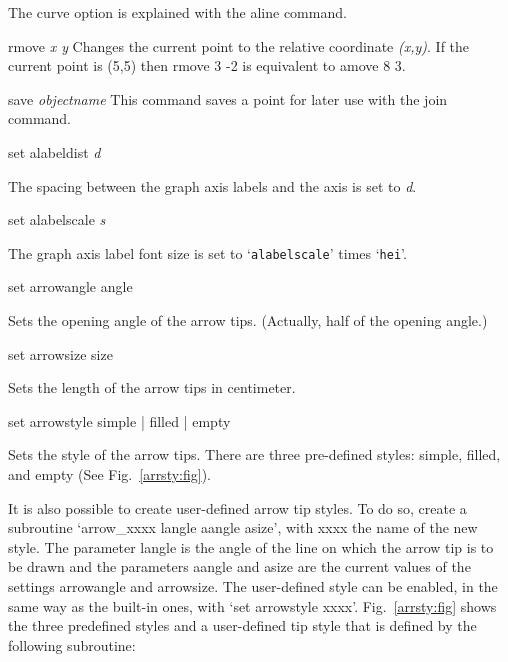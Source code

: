 \begin{commanddescription}
The {\sf curve} option is explained with the {\sf aline} command.

\item[{\sf rmove {\it x y}}]
 Changes the current point to the relative coordinate
{\it (x,y)}.  If the
current point is (5,5) then {\sf rmove 3 -2} is equivalent to {\sf amove 8 3}.

\item[{\sf save {\it objectname}} ]
This command saves a point for later use with the join command.

\item[{\sf set alabeldist {\it d}}]

The spacing between the graph axis labels and the axis is set to {\it d}.

\item[{\sf set alabelscale {\it s}}]

The graph axis label font size is set to `\texttt{alabelscale}' times `\texttt{hei}'.

\item[{\sf set arrowangle {\sf angle}}]

Sets the opening angle of the arrow tips. (Actually, half of the opening angle.)

\item[{\sf set arrowsize {\sf size}}]

Sets the length of the arrow tips in centimeter.

\item[{\sf set arrowstyle {\sf simple | filled | empty}}]

Sets the style of the arrow tips. There are three pre-defined styles: simple, filled, and empty (See Fig.~\ref{arrsty:fig}).

It is also possible to create user-defined arrow tip styles. To do so, create a subroutine `{\sf arrow\_xxxx langle aangle asize}', with {\sf xxxx} the name of the new style. The parameter {\sf langle} is the angle of the line on which the arrow tip is to be drawn and the parameters {\sf aangle} and {\sf asize} are the current values of the settings {\sf arrowangle} and {\sf arrowsize}. The user-defined style can be enabled, in the same way as the built-in ones, with `{\sf set arrowstyle xxxx}'. Fig.~\ref{arrsty:fig} shows the three predefined styles and a user-defined tip style that is defined by the following subroutine:


\end{commanddescription}
